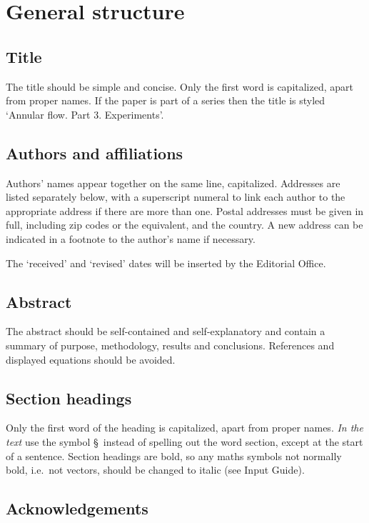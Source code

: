 \documentclass{jfm}
\begin{document}
\section{General structure}

\subsection{Title}

The title should be simple and concise. Only the first word is
capitalized, apart from proper names. If the paper is part of a series
then the title is styled `Annular flow. Part 3. Experiments'.

\subsection{Authors and affiliations}

Authors' names appear together on the same line, capitalized.
Addresses are listed separately below, with a superscript numeral to
link each author to the appropriate address if there are more than one.
Postal addresses must be given in full, including zip codes or the
equivalent, and the country. A new address can be indicated in a footnote
to the author's name if necessary.

The `received' and `revised' dates will be inserted by the Editorial Office.

\subsection{Abstract}

The abstract should be self-contained and self-explanatory and contain a
summary of purpose, methodology, results and conclusions. References and
displayed equations should be avoided.

\subsection{Section headings}

Only the first word of the heading is capitalized, apart from proper names.
\emph{In the text} use the symbol \S \, instead of spelling out the word
section, except at the start of a sentence. Section headings are bold, so any
maths symbols not normally bold, i.e.\ not vectors, should be changed to
italic (see Input Guide).

\subsection{Acknowledgements}
\end{document}
